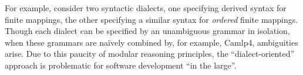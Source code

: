 For example, consider two syntactic dialects, one specifying derived syntax for finite mappings, the other specifying a similar syntax for \emph{ordered} finite mappings. Though each dialect can be specified by an unambiguous grammar in isolation, when these grammars are na\"ively  combined by, for example, Camlp4,  ambiguities  arise. 
Due to this paucity of modular reasoning principles, the ``dialect-oriented'' approach is problematic for software development ``in the large''. %


